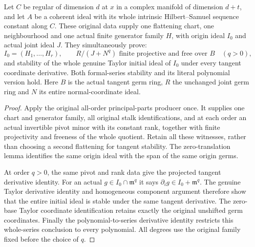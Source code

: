 \begin{theorem}
\label{hir:actual-coupled-centre-free-jets-initial-symbols}
\leanok
{}
Let $C$ be regular of dimension $d$ at $x$ in a complex manifold of
dimension $d+t$, and let $A$ be a coherent ideal with its whole intrinsic
Hilbert--Samuel sequence constant along $C$. These original data supply
one flattening chart, one neighbourhood and one actual finite generator
family $H$, with origin ideal $I_0$ and actual joint ideal $J$.
They simultaneously prove:
\[
 I_0=(H_1,\ldots,H_r),\qquad
 R/(J+N^q)\text{ finite projective and free over }B\quad(q>0),
\]
and stability of the whole genuine Taylor initial ideal of $I_0$ under
every tangent coordinate derivative. Both formal-series stability and its
literal polynomial version hold. Here $B$ is the actual tangent germ ring,
$R$ the unchanged joint germ ring and $N$ its entire normal-coordinate ideal.
\end{theorem}
\begin{proof}
Apply the original all-order principal-parts producer once. It supplies one
chart and generator family, all original stalk identifications, and at each
order an actual invertible pivot minor with its constant rank, together
with finite projectivity and freeness of the whole quotient. Retain all
these witnesses, rather than choosing a second flattening for tangent
stability. The zero-translation lemma identifies the same origin ideal
with the span of the same origin germs.

At order $q>0$, the same pivot and rank data give the projected tangent
derivative identity. For an actual $g\in I_0\cap\mathfrak m^q$ it says
$\partial_i g\in I_0+\mathfrak m^q$. The genuine Taylor derivative
identity and homogeneous component argument therefore show that the
entire initial ideal is stable under the same tangent derivative. The
zero-base Taylor coordinate identification retains exactly the original
unshifted germ coordinates. Finally the polynomial-to-series derivative
identity restricts this whole-series conclusion to every polynomial.
All degrees use the original family fixed before the choice of $q$.
\end{proof}
